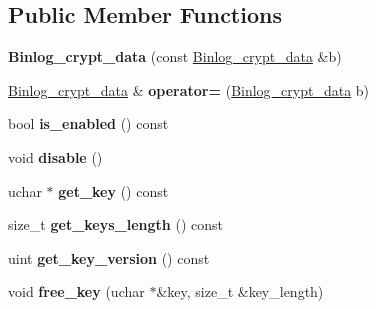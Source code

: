 \subsection*{Public Member Functions}
\begin{DoxyCompactItemize}
\item 
\mbox{\label{classBinlog__crypt__data_aecd06dd7c04312c5ed05661ab430012b}} 
{\bfseries Binlog\+\_\+crypt\+\_\+data} (const \mbox{\hyperlink{classBinlog__crypt__data}{Binlog\+\_\+crypt\+\_\+data}} \&b)
\item 
\mbox{\label{classBinlog__crypt__data_aded0388ef00e5543eb6a2c4e72515e0c}} 
\mbox{\hyperlink{classBinlog__crypt__data}{Binlog\+\_\+crypt\+\_\+data}} \& {\bfseries operator=} (\mbox{\hyperlink{classBinlog__crypt__data}{Binlog\+\_\+crypt\+\_\+data}} b)
\item 
\mbox{\label{classBinlog__crypt__data_a652365bf916a6f8e629404a9c07797c3}} 
bool {\bfseries is\+\_\+enabled} () const
\item 
\mbox{\label{classBinlog__crypt__data_aa13a952b460dc211b5781d44d1044f36}} 
void {\bfseries disable} ()
\item 
\mbox{\label{classBinlog__crypt__data_adeff9b4aeb41a3e269ed85aaca37b634}} 
uchar $\ast$ {\bfseries get\+\_\+key} () const
\item 
\mbox{\label{classBinlog__crypt__data_a340dc43e58d478574b6378525d581a0b}} 
size\+\_\+t {\bfseries get\+\_\+keys\+\_\+length} () const
\item 
\mbox{\label{classBinlog__crypt__data_a5baa8604c61517f9eaf806a9a365f1b2}} 
uint {\bfseries get\+\_\+key\+\_\+version} () const
\item 
\mbox{\label{classBinlog__crypt__data_a7a8be2c46daabfadd72cb16c2dce4cfd}} 
void {\bfseries free\+\_\+key} (uchar $\ast$\&key, size\+\_\+t \&key\+\_\+length)
\item 
\mbox{\label{classBinlog__crypt__data_a34cb21a796d1fd12b70645fb0de70d2b}} 

\end{DoxyCompactItemize}
